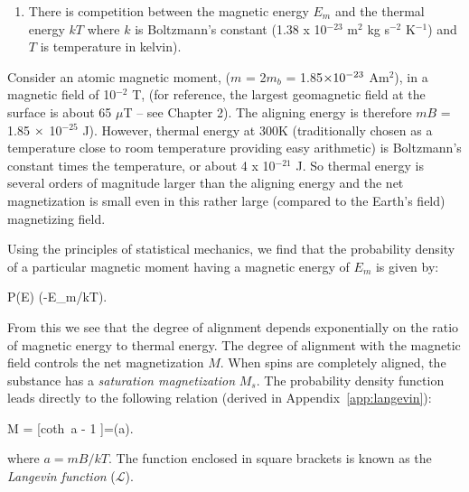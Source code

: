 {\begin{enumerate}
\beq
E_m = -\m \cdot \B = -mB  \cos \theta.
\label{eq:Em}
\eeq



 Magnetic energy is at a minimum when the
magnetic moment is lined up with the magnetic field.  

\item There is  competition between the 
magnetic energy $E_m$ and the 
 thermal energy $kT$ 
 where $k$ is 
Boltzmann's constant (1.38 x 10$^{-23}$ m$^2$ kg s$^{-2}$ K$^{-1}$) and $T$ is
temperature in kelvin).
\end{enumerate}

Consider an atomic magnetic moment, ($m$ = 2$m_b$ = 1.85$\times 10^{-23}$
Am$^2$), in a magnetic field of 10$^{-2}$ T, (for reference, the largest  geomagnetic field at the surface is about 65 $\mu$T -- see Chapter 2). The aligning energy is therefore 
$mB$ = 1.85 $\times$ 10$^{-25}$ J). However, thermal energy at 300K
(traditionally chosen as a temperature close to room temperature providing easy arithmetic) is 
Boltzmann's constant  times the temperature,  or  about  4 x 10$^{-21}$ J.   So thermal energy is several orders of magnitude larger than the
aligning energy and  the net magnetization is small even in this rather large (compared to the Earth's field) magnetizing field.




Using the principles of 
statistical mechanics, we find that the
probability  density of a particular magnetic moment having a 
magnetic energy of  $E_m$ is given by:

\beq
P(E) \propto \exp (-E_m/kT).
\label{eq:PE}
\eeq

\noindent From this we see that the degree of alignment depends exponentially on the ratio of magnetic energy to thermal energy.  The degree of alignment with the magnetic field controls the net magnetization $M$.  When spins are completely aligned, the substance has a
 {\it saturation magnetization} $M_s$.  The probability density function leads directly to the following relation (derived in  Appendix~\ref{app:langevin}): 

\beq
{M} =
{ [\hbox{coth }a -
{
1
}]=(a).
}
\label{eq:Lang} 
\eeq

\noindent where  $a=mB/kT$. The function enclosed in square brackets is known as the 
{\it Langevin function} ($\mathcal{L}$).


}
